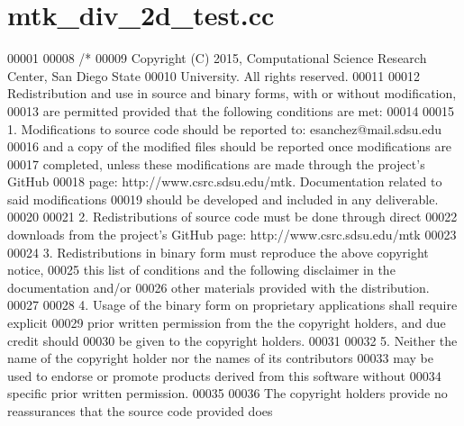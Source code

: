 \hypertarget{mtk__div__2d__test_8cc_source}{\section{mtk\+\_\+div\+\_\+2d\+\_\+test.\+cc}
\label{mtk__div__2d__test_8cc_source}
}

\begin{DoxyCode}
00001 
00008 \textcolor{comment}{/*}
00009 \textcolor{comment}{Copyright (C) 2015, Computational Science Research Center, San Diego State}
00010 \textcolor{comment}{University. All rights reserved.}
00011 \textcolor{comment}{}
00012 \textcolor{comment}{Redistribution and use in source and binary forms, with or without modification,}
00013 \textcolor{comment}{are permitted provided that the following conditions are met:}
00014 \textcolor{comment}{}
00015 \textcolor{comment}{1. Modifications to source code should be reported to: esanchez@mail.sdsu.edu}
00016 \textcolor{comment}{and a copy of the modified files should be reported once modifications are}
00017 \textcolor{comment}{completed, unless these modifications are made through the project's GitHub}
00018 \textcolor{comment}{page: http://www.csrc.sdsu.edu/mtk. Documentation related to said modifications}
00019 \textcolor{comment}{should be developed and included in any deliverable.}
00020 \textcolor{comment}{}
00021 \textcolor{comment}{2. Redistributions of source code must be done through direct}
00022 \textcolor{comment}{downloads from the project's GitHub page: http://www.csrc.sdsu.edu/mtk}
00023 \textcolor{comment}{}
00024 \textcolor{comment}{3. Redistributions in binary form must reproduce the above copyright notice,}
00025 \textcolor{comment}{this list of conditions and the following disclaimer in the documentation and/or}
00026 \textcolor{comment}{other materials provided with the distribution.}
00027 \textcolor{comment}{}
00028 \textcolor{comment}{4. Usage of the binary form on proprietary applications shall require explicit}
00029 \textcolor{comment}{prior written permission from the the copyright holders, and due credit should}
00030 \textcolor{comment}{be given to the copyright holders.}
00031 \textcolor{comment}{}
00032 \textcolor{comment}{5. Neither the name of the copyright holder nor the names of its contributors}
00033 \textcolor{comment}{may be used to endorse or promote products derived from this software without}
00034 \textcolor{comment}{specific prior written permission.}
00035 \textcolor{comment}{}
00036 \textcolor{comment}{The copyright holders provide no reassurances that the source code provided does}

\end{DoxyCode}
